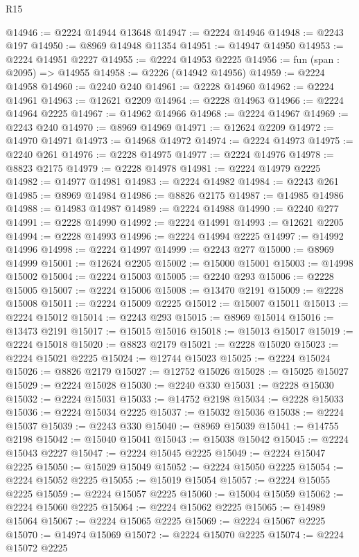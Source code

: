 \begin{lexlean}{R15}
\begin{coremodule}
@14946 := @2224 @14944 @13648
@14947 := @2224 @14946
@14948 := @2243 @197
@14950 := @8969 @14948 @11354
@14951 := @14947 @14950
@14953 := @2224 @14951 @2227
@14955 := @2224 @14953 @2225
@14956 := fun (span : @2095) => @14955
@14958 := @2226 (@14942 @14956)
@14959 := @2224 @14958
@14960 := @2240 @240
@14961 := @2228 @14960
@14962 := @2224 @14961
@14963 := @12621 @2209
@14964 := @2228 @14963
@14966 := @2224 @14964 @2225
@14967 := @14962 @14966
@14968 := @2224 @14967
@14969 := @2243 @240
@14970 := @8969 @14969
@14971 := @12624 @2209
@14972 := @14970 @14971
@14973 := @14968 @14972
@14974 := @2224 @14973
@14975 := @2240 @261
@14976 := @2228 @14975
@14977 := @2224 @14976
@14978 := @8823 @2175
@14979 := @2228 @14978
@14981 := @2224 @14979 @2225
@14982 := @14977 @14981
@14983 := @2224 @14982
@14984 := @2243 @261
@14985 := @8969 @14984
@14986 := @8826 @2175
@14987 := @14985 @14986
@14988 := @14983 @14987
@14989 := @2224 @14988
@14990 := @2240 @277
@14991 := @2228 @14990
@14992 := @2224 @14991
@14993 := @12621 @2205
@14994 := @2228 @14993
@14996 := @2224 @14994 @2225
@14997 := @14992 @14996
@14998 := @2224 @14997
@14999 := @2243 @277
@15000 := @8969 @14999
@15001 := @12624 @2205
@15002 := @15000 @15001
@15003 := @14998 @15002
@15004 := @2224 @15003
@15005 := @2240 @293
@15006 := @2228 @15005
@15007 := @2224 @15006
@15008 := @13470 @2191
@15009 := @2228 @15008
@15011 := @2224 @15009 @2225
@15012 := @15007 @15011
@15013 := @2224 @15012
@15014 := @2243 @293
@15015 := @8969 @15014
@15016 := @13473 @2191
@15017 := @15015 @15016
@15018 := @15013 @15017
@15019 := @2224 @15018
@15020 := @8823 @2179
@15021 := @2228 @15020
@15023 := @2224 @15021 @2225
@15024 := @12744 @15023
@15025 := @2224 @15024
@15026 := @8826 @2179
@15027 := @12752 @15026
@15028 := @15025 @15027
@15029 := @2224 @15028
@15030 := @2240 @330
@15031 := @2228 @15030
@15032 := @2224 @15031
@15033 := @14752 @2198
@15034 := @2228 @15033
@15036 := @2224 @15034 @2225
@15037 := @15032 @15036
@15038 := @2224 @15037
@15039 := @2243 @330
@15040 := @8969 @15039
@15041 := @14755 @2198
@15042 := @15040 @15041
@15043 := @15038 @15042
@15045 := @2224 @15043 @2227
@15047 := @2224 @15045 @2225
@15049 := @2224 @15047 @2225
@15050 := @15029 @15049
@15052 := @2224 @15050 @2225
@15054 := @2224 @15052 @2225
@15055 := @15019 @15054
@15057 := @2224 @15055 @2225
@15059 := @2224 @15057 @2225
@15060 := @15004 @15059
@15062 := @2224 @15060 @2225
@15064 := @2224 @15062 @2225
@15065 := @14989 @15064
@15067 := @2224 @15065 @2225
@15069 := @2224 @15067 @2225
@15070 := @14974 @15069
@15072 := @2224 @15070 @2225
@15074 := @2224 @15072 @2225

\end{coremodule}
\end{lexlean}
